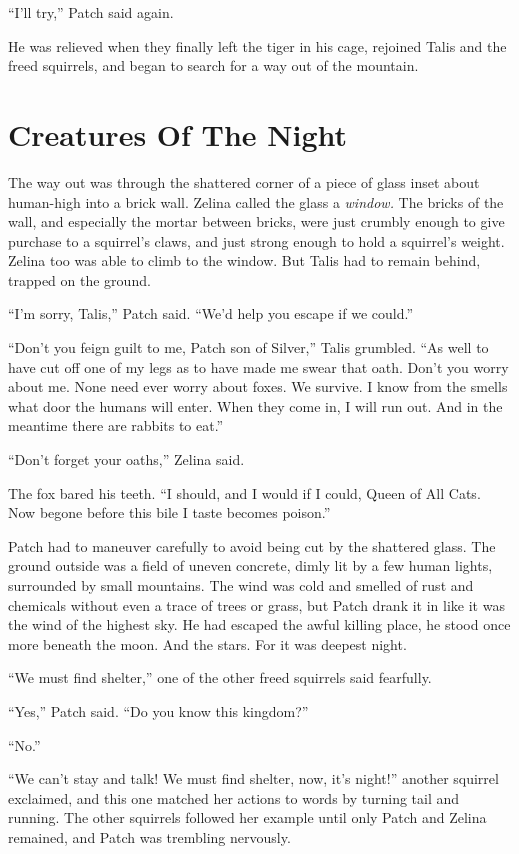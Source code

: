 \documentclass[ebook,oneside,openany,12pt]{memoir}
\begin{document}
“I’ll try,” Patch said again.

He was relieved when they finally left the tiger in his cage, rejoined
Talis and the freed squirrels, and began to search for a way out of
the mountain.


\section{Creatures Of The Night}

The way out was through the shattered corner of a piece of glass inset
about human-high into a brick wall. Zelina called the glass a
\emph{window.} The bricks of the wall, and especially the mortar
between bricks, were just crumbly enough to give purchase to a
squirrel’s claws, and just strong enough to hold a squirrel’s
weight. Zelina too was able to climb to the window. But Talis had to
remain behind, trapped on the ground.

“I’m sorry, Talis,” Patch said. “We’d help you escape if we could.”

“Don’t you feign guilt to me, Patch son of Silver,” Talis
grumbled. “As well to have cut off one of my legs as to have made me
swear that oath. Don’t you worry about me. None need ever worry about
foxes. We survive. I know from the smells what door the humans will
enter. When they come in, I will run out. And in the meantime there
are rabbits to eat.”

“Don’t forget your oaths,” Zelina said.

The fox bared his teeth. “I should, and I would if I could, Queen of
All Cats. Now begone before this bile I taste becomes poison.”

Patch had to maneuver carefully to avoid being cut by the shattered
glass. The ground outside was a field of uneven concrete, dimly lit by
a few human lights, surrounded by small mountains. The wind was cold
and smelled of rust and chemicals without even a trace of trees or
grass, but Patch drank it in like it was the wind of the highest
sky. He had escaped the awful killing place, he stood once more
beneath the moon. And the stars. For it was deepest night.

“We must find shelter,” one of the other freed squirrels said
fearfully.

“Yes,” Patch said. “Do you know this kingdom?”

“No.”

“We can’t stay and talk! We must find shelter, now, it’s night!”
another squirrel exclaimed, and this one matched her actions to words
by turning tail and running. The other squirrels followed her example
until only Patch and Zelina remained, and Patch was trembling
nervously.
\end{document}
